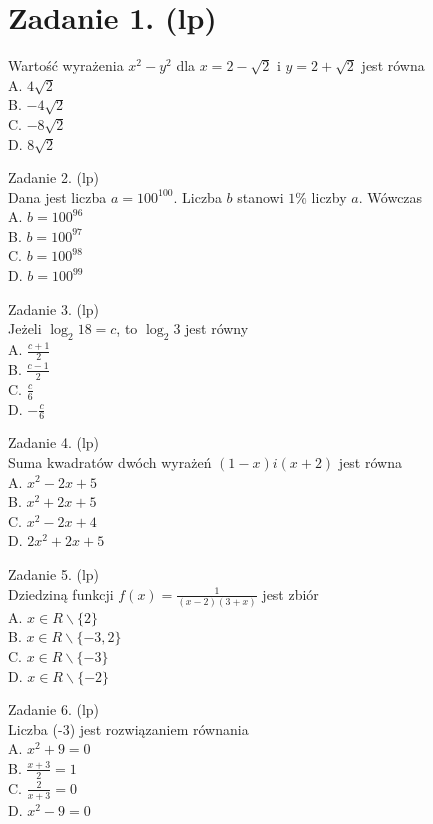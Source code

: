 \documentclass[10pt]{article}
\begin{document}
\section*{Zadanie 1. (lp)}
Wartość wyrażenia \(x^{2}-y^{2}\) dla \(x=2-\sqrt{2}\) i \(y=2+\sqrt{2}\) jest równa\\
A. \(4 \sqrt{2}\)\\
B. \(-4 \sqrt{2}\)\\
C. \(-8 \sqrt{2}\)\\
D. \(8 \sqrt{2}\)

Zadanie 2. (lp)\\
Dana jest liczba \(a=100^{100}\). Liczba \(b\) stanowi \(1 \%\) liczby \(a\). Wówczas\\
A. \(b=100^{96}\)\\
B. \(b=100^{97}\)\\
C. \(b=100^{98}\)\\
D. \(b=100^{99}\)

Zadanie 3. (lp)\\
Jeżeli \(\log _{2} 18=c\), to \(\log _{2} 3\) jest równy\\
A. \(\frac{c+1}{2}\)\\
B. \(\frac{c-1}{2}\)\\
C. \(\frac{c}{6}\)\\
D. \(-\frac{c}{6}\)

Zadanie 4. (lp)\\
Suma kwadratów dwóch wyrażeń \((1-x) i(x+2)\) jest równa\\
A. \(x^{2}-2 x+5\)\\
B. \(x^{2}+2 x+5\)\\
C. \(x^{2}-2 x+4\)\\
D. \(2 x^{2}+2 x+5\)

Zadanie 5. (lp)\\
Dziedziną funkcji \(f(x)=\frac{1}{(x-2)(3+x)}\) jest zbiór\\
A. \(x \in R \backslash\{2\}\)\\
B. \(x \in R \backslash\{-3,2\}\)\\
C. \(x \in R \backslash\{-3\}\)\\
D. \(x \in R \backslash\{-2\}\)

Zadanie 6. (lp)\\
Liczba (-3) jest rozwiązaniem równania\\
A. \(x^{2}+9=0\)\\
B. \(\frac{x+3}{2}=1\)\\
C. \(\frac{2}{x+3}=0\)\\
D. \(x^{2}-9=0\)
\end{document}
